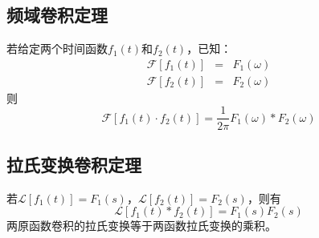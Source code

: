 \documentclass[12pt,a4paper]{article}
\begin{document}
\subsection{频域卷积定理}
若给定两个时间函数$f_1(t)$和$f_2(t)$，已知：
\begin{eqnarray*}
\mathscr{F}[f_1(t)] &=& F_1(\omega) \\
\mathscr{F}[f_2(t)] &=& F_2(\omega)
\end{eqnarray*}
则
\begin{equation}
\mathscr{F}[f_1(t) \cdot f_2(t)] =  \frac{1}{2\pi} F_1(\omega)*F_2(\omega)
\end{equation}

\subsection{拉氏变换卷积定理}
若$\mathscr{L}[f_1(t)] = F_1(s)$，$\mathscr{L}[f_2(t)] = F_2(s)$，则有
\begin{equation}
\mathscr{L}[f_1(t) * f_2(t)] = F_1(s) F_2(s)
\end{equation}
两原函数卷积的拉氏变换等于两函数拉氏变换的乘积。
\end{document}
